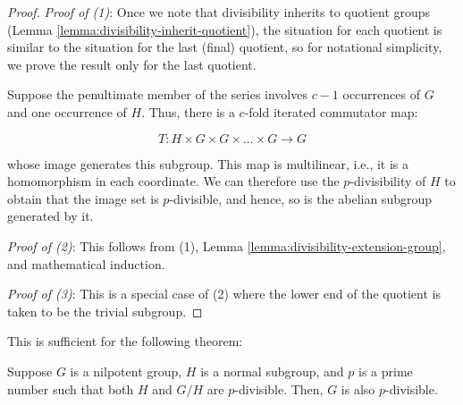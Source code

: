 \begin{proof}
  {\em Proof of (1)}: Once we note that divisibility inherits to
  quotient groups (Lemma \ref{lemma:divisibility-inherit-quotient}), the
  situation for each quotient is similar to the situation for the last
  (final) quotient, so for notational simplicity, we prove the result
  only for the last quotient.

  Suppose the penultimate member of the series involves $c - 1$
  occurrences of $G$ and one occurrence of $H$. Thus, there is a
  $c$-fold iterated commutator map:

  $$T: H \times G \times G \times \dots \times G \to G$$

  whose image generates this subgroup. This map is multilinear, i.e.,
  it is a homomorphism in each coordinate. We can therefore use the
  $p$-divisibility of $H$ to obtain that the image set is
  $p$-divisible, and hence, so is the abelian subgroup generated by
  it.

  {\em Proof of (2)}: This follows from (1), Lemma
  \ref{lemma:divisibility-extension-group}, and mathematical induction.

  {\em Proof of (3)}: This is a special case of (2) where the lower
  end of the quotient is taken to be the trivial subgroup.
\end{proof}

This is sufficient for the following theorem:

\begin{theorem}\label{thm:divisibility-extension-group-general}
  Suppose $G$ is a nilpotent group, $H$ is a normal subgroup, and $p$
  is a prime number such that both $H$ and $G/H$ are
  $p$-divisible. Then, $G$ is also $p$-divisible.
\end{theorem}

